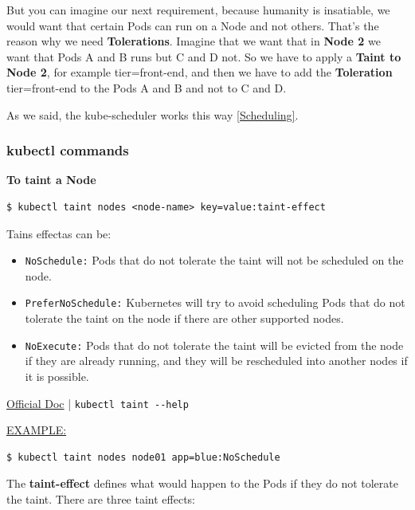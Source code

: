\documentclass{article}
\newenvironment{codetemplate}[1][]{%
  \mybasecolorbox[#1]
  \itshape
}{%
  \endmybasecolorbox
}
\begin{document}
But you can imagine our next requirement, because humanity is insatiable, we would want that certain Pods can run on a Node and not others. That's the reason why we need \textbf{Tolerations}. Imagine that we want that in \textbf{Node 2} we want that Pods A and B runs but C and D not. So we have to apply a \textbf{Taint to Node 2}, for example tier=front-end, and then we have to add the \textbf{Toleration} tier=front-end to the Pods A and B and not to C and D.

As we said, the kube-scheduler works this way \ref{Scheduling}. 

\subsubsection{kubectl commands}

\textbf{To taint a Node}
\begin{codetemplate}{}
\begin{verbatim}
$ kubectl taint nodes <node-name> key=value:taint-effect
\end{verbatim}
\end{codetemplate}

Tains effectas can be:
\begin{itemize}
    \item \verb|NoSchedule:| Pods that do not tolerate the taint will not be scheduled on the node.
    \item \verb|PreferNoSchedule:| Kubernetes will try to avoid scheduling Pods that do not tolerate the taint on the node if there are other supported nodes.
    \item \verb|NoExecute:| Pods that do not tolerate the taint will be evicted from the node if they are already running, and they will be rescheduled into another nodes if it is possible.
\end{itemize}

\href{https://kubernetes.io/docs/concepts/scheduling-eviction/taint-and-toleration/}{Official Doc} | \verb|kubectl taint --help|

\underline{EXAMPLE:}
\begin{codetemplate}{}
\begin{verbatim}
$ kubectl taint nodes node01 app=blue:NoSchedule
\end{verbatim}
\end{codetemplate}

The \textbf{taint-effect} defines what would happen to the Pods if they do not tolerate the taint. There are three taint effects:
\end{document}
